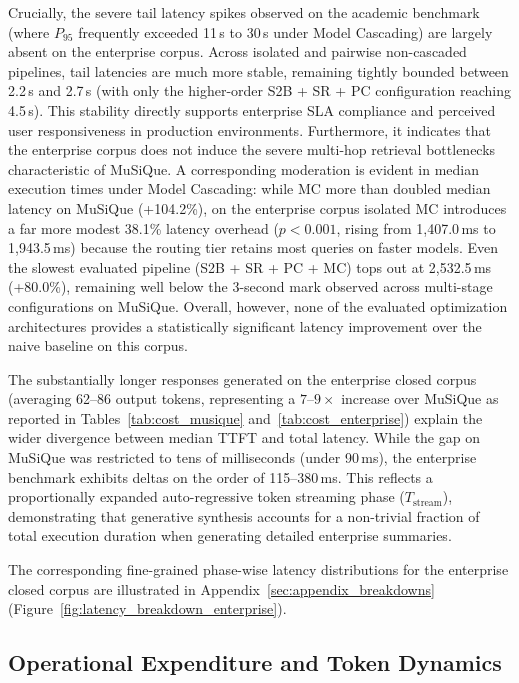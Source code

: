 Crucially, the severe tail latency spikes observed on the academic benchmark (where $P_{95}$ frequently exceeded 11\,s to 30\,s under Model Cascading) are largely absent on the enterprise corpus. Across isolated and pairwise non-cascaded pipelines, tail latencies are much more stable, remaining tightly bounded between 2.2\,s and 2.7\,s (with only the higher-order S2B + SR + PC configuration reaching 4.5\,s). This stability directly supports enterprise SLA compliance and perceived user responsiveness in production environments. Furthermore, it indicates that the enterprise corpus does not induce the severe multi-hop retrieval bottlenecks characteristic of MuSiQue. A corresponding moderation is evident in median execution times under Model Cascading: while MC more than doubled median latency on MuSiQue (+104.2\%), on the enterprise corpus isolated MC introduces a far more modest 38.1\% latency overhead ($p < 0.001$, rising from 1,407.0\,ms to 1,943.5\,ms) because the routing tier retains most queries on faster models. Even the slowest evaluated pipeline (S2B + SR + PC + MC) tops out at 2,532.5\,ms (+80.0\%), remaining well below the 3-second mark observed across multi-stage configurations on MuSiQue. Overall, however, none of the evaluated optimization architectures provides a statistically significant latency improvement over the naive baseline on this corpus. 

The substantially longer responses generated on the enterprise closed corpus (averaging 62--86 output tokens, representing a $7\text{--}9\times$ increase over MuSiQue as reported in Tables~\ref{tab:cost_musique} and~\ref{tab:cost_enterprise}) explain the wider divergence between median TTFT and total latency. While the gap on MuSiQue was restricted to tens of milliseconds (under 90\,ms), the enterprise benchmark exhibits deltas on the order of 115--380\,ms. This reflects a proportionally expanded auto-regressive token streaming phase ($T_{\text{stream}}$), demonstrating that generative synthesis accounts for a non-trivial fraction of total execution duration when generating detailed enterprise summaries.

The corresponding fine-grained phase-wise latency distributions for the enterprise closed corpus are illustrated in Appendix~\ref{sec:appendix_breakdowns} (Figure~\ref{fig:latency_breakdown_enterprise}).

\FloatBarrier
\subsection{Operational Expenditure and Token Dynamics}
\label{subsec:results_cost}

